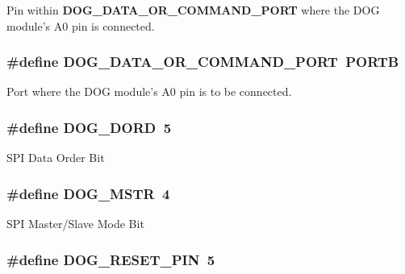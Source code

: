 Pin within {\bfseries D\-O\-G\-\_\-\-D\-A\-T\-A\-\_\-\-O\-R\-\_\-\-C\-O\-M\-M\-A\-N\-D\-\_\-\-P\-O\-R\-T} where the D\-O\-G module's A0 pin is connected. \hypertarget{group___d_o_g_m128__user__configuration_ga7a79d5d66a25812afb30f2524490af3e}{
\subsubsection[{D\-O\-G\-\_\-\-D\-A\-T\-A\-\_\-\-O\-R\-\_\-\-C\-O\-M\-M\-A\-N\-D\-\_\-\-P\-O\-R\-T}]{\setlength{\rightskip}{0pt plus 5cm}\#define D\-O\-G\-\_\-\-D\-A\-T\-A\-\_\-\-O\-R\-\_\-\-C\-O\-M\-M\-A\-N\-D\-\_\-\-P\-O\-R\-T~P\-O\-R\-T\-B}}\label{group___d_o_g_m128__user__configuration_ga7a79d5d66a25812afb30f2524490af3e}
Port where the D\-O\-G module's A0 pin is to be connected. \hypertarget{group___d_o_g_m128__user__configuration_ga11db14770d84767d880859e22f576431}{
\subsubsection[{D\-O\-G\-\_\-\-D\-O\-R\-D}]{\setlength{\rightskip}{0pt plus 5cm}\#define D\-O\-G\-\_\-\-D\-O\-R\-D~5}}\label{group___d_o_g_m128__user__configuration_ga11db14770d84767d880859e22f576431}
S\-P\-I Data Order Bit \hypertarget{group___d_o_g_m128__user__configuration_gad4d7a46634e1ad445a83a65fe86f6ea3}{
\subsubsection[{D\-O\-G\-\_\-\-M\-S\-T\-R}]{\setlength{\rightskip}{0pt plus 5cm}\#define D\-O\-G\-\_\-\-M\-S\-T\-R~4}}\label{group___d_o_g_m128__user__configuration_gad4d7a46634e1ad445a83a65fe86f6ea3}
S\-P\-I Master/\-Slave Mode Bit \hypertarget{group___d_o_g_m128__user__configuration_gab6cbac4e4756ac898479caef5b76cd29}{
\subsubsection[{D\-O\-G\-\_\-\-R\-E\-S\-E\-T\-\_\-\-P\-I\-N}]{\setlength{\rightskip}{0pt plus 5cm}\#define D\-O\-G\-\_\-\-R\-E\-S\-E\-T\-\_\-\-P\-I\-N~5}}\label{group___d_o_g_m128__user__configuration_gab6cbac4e4756ac898479caef5b76cd29}
